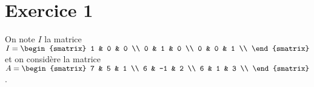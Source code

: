 \documentclass[11pt]{article}%
\begin{document}
\indent \vspace{0.3cm}


\vspace{0.5cm}

\section*{Exercice 1}

\noindent On note $I$ la matrice $I = \begin{smatrix}
1 & 0 & 0 \\
0 & 1 & 0 \\
0 & 0 & 1 \\
\end{smatrix}
$ et on considère la matrice $A = \begin{smatrix}
7 & 5 & 1 \\
6 & -1 & 2 \\
6 & 1 & 3 \\
\end{smatrix}
$. 
\end{document}
